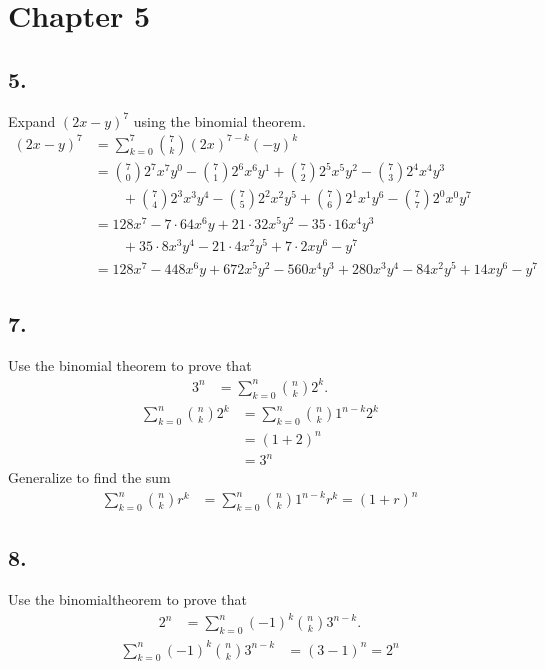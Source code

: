 \documentclass{article}
\begin{document}
\section*{Chapter 5}
\subsection*{5.}
Expand $(2x-y)^7$ using the binomial theorem.
\begin{align*}
  (2x-y)^7&=\sum\limits_{k=0}^7{\binom{7}{k}(2x)^{7-k}(-y)^k}\\
  &=\binom{7}{0}2^7x^7y^0-\binom{7}{1}2^6x^6y^1+\binom{7}{2}2^5x^5y^2-\binom{7}{3}2^4x^4y^3\\
  &\qquad+\binom{7}{4}2^3x^3y^4-\binom{7}{5}2^2x^2y^5+\binom{7}{6}2^1x^1y^6-\binom{7}{7}2^0x^0y^7\\
  &=128x^7-7\cdot64x^6y+21\cdot32x^5y^2-35\cdot16x^4y^3\\
  &\qquad+35\cdot8x^3y^4-21\cdot4x^2y^5+7\cdot2xy^6-y^7\\
  &=128x^7-448x^6y+672x^5y^2-560x^4y^3+280x^3y^4-84x^2y^5+14xy^6-y^7
\end{align*}
\subsection*{7.}
Use the binomial theorem to prove that
\begin{align*}
  3^n&=\sum\limits_{k=0}^n{\binom{n}{k}2^k}.
\end{align*}
\begin{align*}
  \sum\limits_{k=0}^n{\binom{n}{k}2^k}&=\sum\limits_{k=0}^n{\binom{n}{k}1^{n-k}2^k}\\
  &=(1+2)^n\\
  &=3^n
\end{align*}
Generalize to find the sum
\begin{align*}
  \sum\limits_{k=0}^n{\binom{n}{k}r^k}&=\sum\limits_{k=0}^n{\binom{n}{k}1^{n-k}r^k}=(1+r)^n
\end{align*}
\subsection*{8.}
Use the binomialtheorem to prove that
\begin{align*}
  2^n&=\sum\limits_{k=0}^n{(-1)^k\binom{n}{k}3^{n-k}}.
\end{align*}
\begin{align*}
  \sum\limits_{k=0}^n{(-1)^k\binom{n}{k}3^{n-k}}&=(3-1)^n=2^n
\end{align*}
\end{document}
